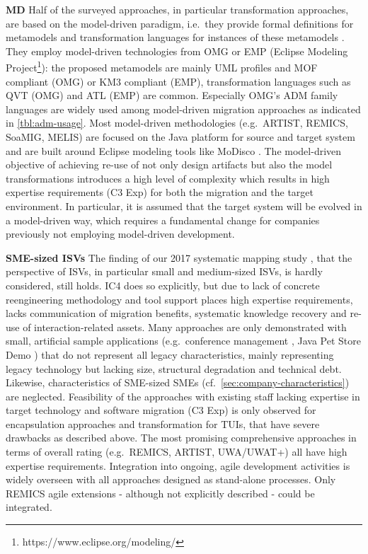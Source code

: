 \textbf{MD} Half of the surveyed approaches, in particular transformation approaches, are based on the model-driven paradigm, i.e.~they provide formal definitions for metamodels and transformation languages for instances of these metamodels \autocite{Fuhr2013SOAMIG}.
They employ model-driven technologies from OMG or EMP (Eclipse Modeling Project\footnote{https://www.eclipse.org/modeling/}): the proposed metamodels are mainly UML profiles and MOF compliant (OMG) or KM3 compliant (EMP), transformation languages such as QVT (OMG) and ATL (EMP) are common.
Especially OMG's ADM family languages are widely used among model-driven migration approaches as indicated in \cref{tbl:adm-usage}.
Most model-driven methodologies (e.g.~ARTIST, REMICS, SoaMIG, MELIS) are focused on the Java platform for source and target system and are built around Eclipse modeling tools like MoDisco \autocite{Perez-Castillo2011Reengineering}.
The model-driven objective of achieving re-use of not only design artifacts but also the model transformations introduces a high level of complexity which results in high expertise requirements (C3 Exp) for both the migration and the target environment.
In particular, it is assumed that the target system will be evolved in a model-driven way, which requires a fundamental change for companies previously not employing model-driven development.

\textbf{SME-sized ISVs} The finding of our 2017 systematic mapping study \autocite{Heil2017Survey}, that the perspective of ISVs, in particular small and medium-sized ISVs, is hardly considered, still holds.
IC4 does so explicitly, but due to lack of concrete reengineering methodology and tool support places high expertise requirements, lacks communication of migration benefits, systematic knowledge recovery and re-use of interaction-related assets.
Many approaches are only demonstrated with small, artificial sample applications (e.g.~conference management \autocite{Sosa2014MigraSOA}, Java Pet Store Demo \autocite{Rodriguez-Echeverria2012MIGRARIA}) that do not represent all legacy characteristics, mainly representing legacy technology but lacking size, structural degradation and technical debt.
Likewise, characteristics of SME-sized SMEs (cf.~\cref{sec:company-characteristics}) are neglected.
Feasibility of the approaches with existing staff lacking expertise in target technology and software migration (C3 Exp) is only observed for encapsulation approaches and transformation for TUIs, that have severe drawbacks as described above.
The most promising comprehensive approaches in terms of overall rating (e.g.~REMICS, ARTIST, UWA/UWAT+) all have high expertise requirements.
Integration into ongoing, agile development activities is widely overseen with all approaches designed as stand-alone processes.
Only REMICS agile extensions - although not explicitly described - could be integrated.

